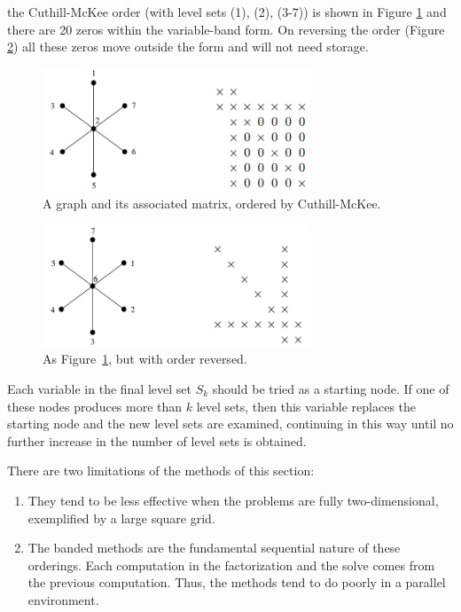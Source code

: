 \begin{exm}
  the Cuthill-McKee order (with level sets (1), (2), (3-7)) is shown
  in Figure \ref{fig:CMorder} and there are 20 zeros within the
  variable-band form. On reversing the order (Figure
  \ref{fig:RCMorder}) all these zeros move outside the form and will
  not need storage. 

  \begin{figure}[H]
    \centering
    \includegraphics[width=8cm]{png/CMorder.png}
    \caption{A graph and its associated matrix, ordered by Cuthill-McKee.}
    \label{fig:CMorder}
  \end{figure}

  \begin{figure}[H]
    \centering
    \includegraphics[width=8cm]{png/RCMorder.png}
    \caption{As Figure~\ref{fig:CMorder}, but with order reversed.}
    \label{fig:RCMorder}
  \end{figure}
\end{exm}

\begin{alg}
  Each variable in the final level set $S_k$ should be tried as a
  starting node. If one of these nodes produces more than $k$ level
  sets, then this variable replaces the starting node and the new
  level sets are examined, continuing in this way until no further
  increase in the number of level sets is obtained.
\end{alg}

\begin{rmk}
  There are two limitations of the methods of this section:
  \begin{enumerate}
  \item They tend to be less effective when the problems are fully
    two-dimensional, exemplified by a large square grid.
  \item The banded methods are the fundamental sequential nature of
    these orderings. Each computation in the factorization and the
    solve comes from the previous computation. Thus, the methods tend
    to do poorly in a parallel environment.
  \end{enumerate} 
\end{rmk}

